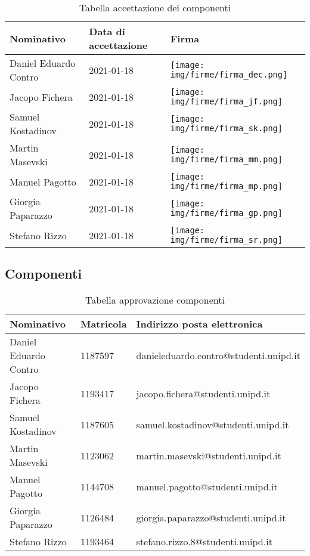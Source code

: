 \documentclass[../piano_di_progetto.tex]{subfiles}
\begin{document}
\begin{table}[!ht]
	\centering
	\begin{tabular}{|l|l|l|}
		\hline
		\rowcolor{lightgray}
		\textbf{Nominativo} & \textbf{Data di accettazione} & \textbf{Firma} \\ 
		\hline
		Daniel Eduardo Contro & 2021-01-18 & \texttt{[image: img/firme/firma\_dec.png]} \\ 
		Jacopo Fichera & 2021-01-18 & \texttt{[image: img/firme/firma\_jf.png]} \\ 
		Samuel Kostadinov & 2021-01-18 & \texttt{[image: img/firme/firma\_sk.png]} \\
		Martin Masevski & 2021-01-18 & \texttt{[image: img/firme/firma\_mm.png]} \\ 
		Manuel Pagotto & 2021-01-18 & \texttt{[image: img/firme/firma\_mp.png]}  \\ 
		Giorgia Paparazzo & 2021-01-18 & \texttt{[image: img/firme/firma\_gp.png]} \\
		Stefano Rizzo & 2021-01-18 & \texttt{[image: img/firme/firma\_sr.png]}  \\ 
		\hline

	\end{tabular}
		\caption{Tabella accettazione dei componenti}
\end{table}

\newpage
\subsection{Componenti}%
\label{sub:comp}

\begin{table}[!ht]
	\centering
	\begin{tabular}{|l|l|l|}
		\hline
		\rowcolor{lightgray}
		\textbf{Nominativo} & \textbf{Matricola} & \textbf{Indirizzo posta elettronica} \\ 
		\hline
		Daniel Eduardo Contro & 1187597 & danieleduardo.contro@studenti.unipd.it \\ 
		Jacopo Fichera & 1193417  & jacopo.fichera@studenti.unipd.it \\ 
		Samuel Kostadinov & 1187605 & samuel.kostadinov@studenti.unipd.it \\ 
		Martin Masevski & 1123062 & martin.masevski@studenti.unipd.it \\ 
		Manuel Pagotto & 1144708 & manuel.pagotto@studenti.unipd.it \\ 
		Giorgia Paparazzo & 1126484 & giorgia.paparazzo@studenti.unipd.it \\ 
		Stefano Rizzo & 1193464 & stefano.rizzo.8@studenti.unipd.it \\ 
		\hline
	\end{tabular}
		\caption{Tabella approvazione componenti}
\end{table}
\end{document}
